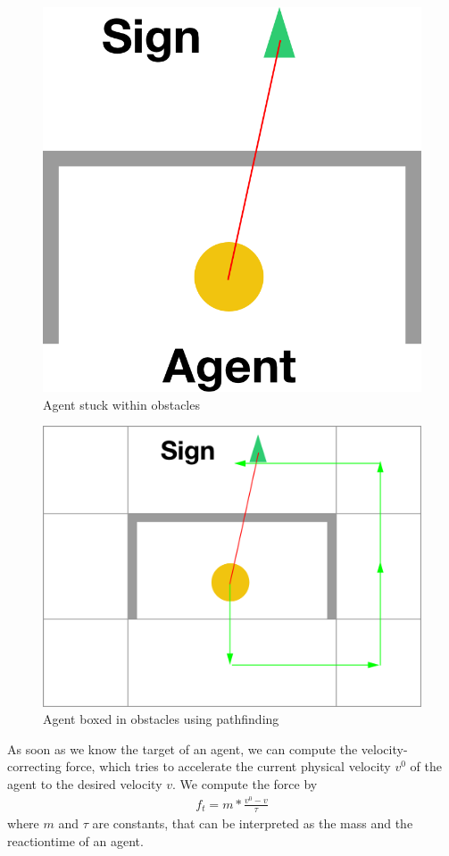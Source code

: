 \documentclass[11pt]{article}
\begin{document}
\begin{itemize}
	\begin{minipage}{.4\textwidth}
		\begin{figure}[H]
			\centering
			\includegraphics[width=.5\linewidth]{assets/without-navmesh}\\
			Agent stuck within obstacles
		\end{figure}
	\end{minipage}
	\begin{minipage}{.2\textwidth}	
	\vfill\hfill
	\end{minipage}
	\begin{minipage}{.4\textwidth}
		\begin{figure}[H]
			\centering
			\includegraphics[width=1\linewidth]{assets/with-navmesh}\\
			Agent boxed in obstacles using pathfinding
		\end{figure}
	\end{minipage}
    
\end{itemize}
As soon as we know the target of an agent, we can compute the velocity-correcting force, which tries to accelerate the current physical velocity $v^0$ of the agent to the desired velocity $v$. We compute the force by    
\begin{align*}
  f_t = m*\frac{v^0-v}{\tau}
\end{align*}
where $m$ and $\tau$ are constants, that can be interpreted as the mass and the reactiontime of an agent.
\end{document}
